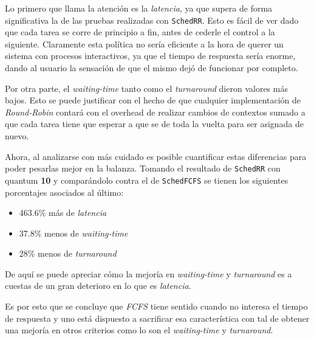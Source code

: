 Lo primero que llama la atención es la \emph{latencia}, ya que supera de forma
significativa la de las pruebas realizadas con \texttt{SchedRR}. Esto es fácil
de ver dado que cada tarea se corre de principio a fin, antes de cederle el
control a la siguiente. Claramente esta política no sería eficiente a la hora de
querer un sistema con procesos interactivos, ya que el tiempo de respuesta sería
enorme, dando al usuario la sensación de que el mismo dejó de funcionar por
completo.

Por otra parte, el \emph{waiting-time} tanto como el \emph{turnaround} dieron
valores más bajos. Esto se puede justificar con el hecho de que cualquier
implementación de \emph{Round-Robin} contará con el overhead de realizar cambios
de contextos sumado a que cada tarea tiene que esperar a que se de toda la
vuelta para ser asignada de nuevo.

Ahora, al analizarse con más cuidado es posible cuantificar estas diferencias para
poder pesarlas mejor en la balanza. Tomando el resultado de \texttt{SchedRR} con
quantum \textbf{10} y comparándolo contra el de \texttt{SchedFCFS} se tienen los
siguientes porcentajes asociados al último:

\begin{itemize}
	\item 463.6\% más de \emph{latencia}
	\item 37.8\% menos de \emph{waiting-time}
	\item 28\% menos de \emph{turnaround}
\end{itemize}

De aquí se puede apreciar cómo la mejoría en \emph{waiting-time} y
\emph{turnaround} es a cuestas de un gran deterioro en lo que es
\emph{latencia}.

Es por esto que se concluye que \emph{FCFS} tiene sentido cuando no interesa el
tiempo de respuesta y uno está dispuesto a sacrificar esa característica con tal
de obtener una mejoría en otros criterios como lo son el \emph{waiting-time} y
\emph{turnaround}.
